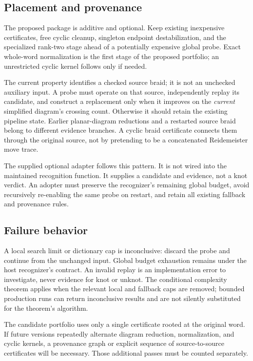\documentclass[11pt,a4paper]{article}
\theoremstyle{definition}\newtheorem{definition}[theorem]{Definition}
\theoremstyle{remark}\newtheorem{remark}[theorem]{Remark}
\newcommand{\code}[1]{\texttt{\detokenize{#1}}}
\begin{document}
\subsection{Placement and provenance}
The proposed package is additive and optional. Keep existing inexpensive
certificates, free cyclic cleanup, singleton endpoint destabilization, and
the specialized rank-two stage ahead of a potentially expensive global
probe. Exact whole-word normalization is the first stage of the proposed
portfolio; an unrestricted cyclic kernel follows only if needed.

The current \code{Diagram.braid_source} property identifies a checked source
braid; it is not an unchecked auxiliary input. A probe must operate on that
source, independently replay its candidate, and construct a replacement
\code{Diagram.from_braid} only when it improves on the \emph{current}
simplified diagram's crossing count. Otherwise it should retain the existing
pipeline state. Earlier planar-diagram reductions and a restarted source
braid belong to different evidence branches. A cyclic braid certificate
connects them through the original source, not by pretending to be a
concatenated Reidemeister move trace.

The supplied optional adapter follows this pattern. It is not wired into
the maintained recognition function. It supplies a candidate and evidence,
not a knot verdict. An adopter must preserve the recognizer's remaining global
budget, avoid recursively re-enabling the same probe on restart, and retain
all existing fallback and provenance rules.

\subsection{Failure behavior}
A local search limit or dictionary cap is inconclusive: discard the probe
and continue from the unchanged input. Global budget exhaustion remains
\code{UNKNOWN} under the host recognizer's contract. An invalid replay is
an implementation error to investigate, never evidence for knot or unknot.
The conditional complexity theorem applies when the relevant local and
fallback caps are removed; bounded production runs can return inconclusive
results and are not silently substituted for the theorem's algorithm.

The candidate portfolio uses only a single certificate rooted at the
original word. If future versions repeatedly alternate diagram reduction,
normalization, and cyclic kernels, a provenance graph or explicit sequence
of source-to-source certificates will be necessary. Those additional passes
must be counted separately.
\end{document}

